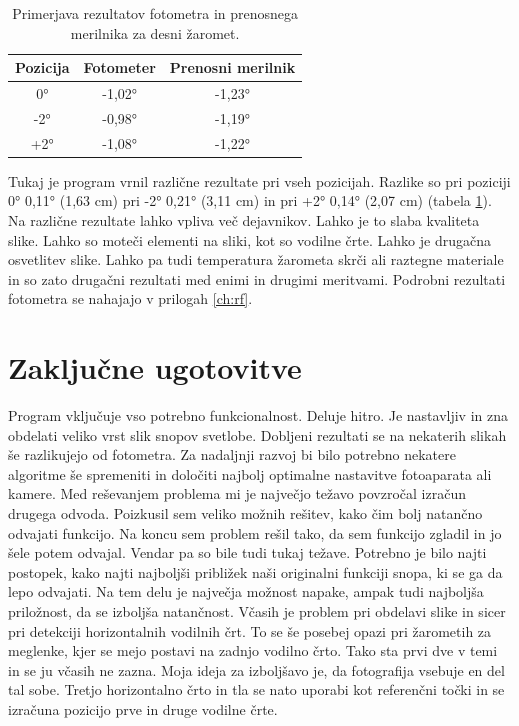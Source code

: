 \documentclass[oneside, a4paper, 12pt]{book}
\begin{document}
\begin{table}
\begin{center}
\begin{tabular}{c|c|c}
\textbf{Pozicija} & \textbf{Fotometer} & \textbf{Prenosni merilnik} \\ \hline
0° & -1,02° & -1,23°  \\ \hline
-2°  & -0,98° & -1,19°   \\ \hline
+2°  & -1,08° & -1,22°   \\ 
\end{tabular}
\end{center}
\vspace{-20pt}
\caption{Primerjava rezultatov fotometra in prenosnega merilnika za 
desni žaromet.}

\label{tbl:primerjava-desni}
\end{table}

Tukaj je program vrnil različne rezultate pri vseh pozicijah. 
Razlike so pri poziciji 0° 0,11° (1,63 cm) pri -2° 0,21° (3,11 cm) 
in pri +2° 0,14° (2,07 cm) (tabela \ref{tbl:primerjava-desni}). Na 
različne rezultate lahko vpliva več dejavnikov. Lahko je to slaba 
kvaliteta slike. Lahko so moteči elementi na sliki, kot so vodilne 
črte. Lahko je drugačna osvetlitev slike. Lahko pa tudi temperatura 
žarometa skrči ali raztegne materiale in so zato drugačni rezultati 
med enimi in drugimi meritvami. Podrobni rezultati fotometra se 
nahajajo v prilogah \ref{ch:rf}.

\chapter{Zaključne ugotovitve}
\label{ch:zakljucek}
Program vključuje vso potrebno funkcionalnost. Deluje hitro. Je 
nastavljiv in zna obdelati veliko vrst slik snopov svetlobe. Dobljeni 
rezultati se na nekaterih slikah še razlikujejo od fotometra. 
Za nadaljnji razvoj bi bilo potrebno nekatere algoritme še spremeniti 
in določiti najbolj optimalne nastavitve fotoaparata ali kamere. 
Med reševanjem problema mi je največjo težavo povzročal izračun drugega 
odvoda. Poizkusil sem veliko možnih rešitev, kako čim bolj natančno 
odvajati funkcijo. Na koncu sem problem rešil tako, da sem funkcijo 
zgladil in jo šele potem odvajal. Vendar pa so bile tudi tukaj težave. 
Potrebno je bilo najti postopek, kako najti najboljši približek naši 
originalni funkciji snopa, ki se ga da lepo odvajati. Na tem delu je 
največja možnost napake, ampak tudi najboljša priložnost, da se izboljša 
natančnost. Včasih je problem pri obdelavi slike in sicer pri detekciji 
horizontalnih vodilnih črt. To se še posebej opazi pri žarometih za 
meglenke, kjer se mejo postavi na zadnjo vodilno črto. Tako sta prvi 
dve v temi in se ju včasih ne zazna. Moja ideja za izboljšavo je, da 
fotografija vsebuje en del tal sobe. Tretjo horizontalno črto in tla 
se nato uporabi kot referenčni točki in se izračuna pozicijo prve in 
druge vodilne črte.
\end{document}

